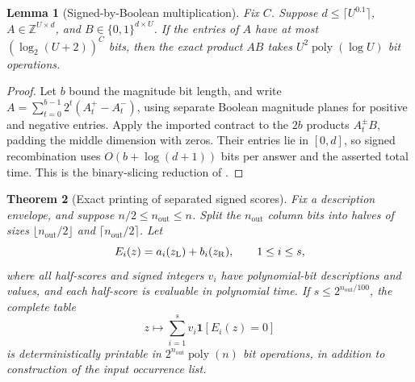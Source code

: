 \documentclass[11pt,letterpaper]{article}
\newtheorem{theorem}{Theorem}[section]
\newtheorem{lemma}[theorem]{Lemma}
\theoremstyle{definition}
\theoremstyle{remark}
\newcommand{\poly}{\operatorname{poly}}
\newcommand{\ind}{\mathbf 1}
\begin{document}
\begin{lemma}[Signed-by-Boolean multiplication]
\label{alg:rectangular}
Fix $C$.  Suppose $d\le\lceil U^{0.1}\rceil$,
$A\in\mathbb Z^{U\times d}$, and $B\in\{0,1\}^{d\times U}$.
If the entries of $A$ have at most $(\log_2(U+2))^C$ bits, then the exact
product $AB$ takes $U^2\poly(\log U)$ bit operations.
\end{lemma}

\begin{proof}
Let $b$ bound the magnitude bit length, and write
$A=\sum_{t=0}^{b-1}2^t(A_t^+-A_t^-)$, using separate Boolean magnitude
planes for positive and negative entries.  Apply the imported contract to
the $2b$ products $A_t^\pm B$, padding the middle dimension with zeros.
Their entries lie in $[0,d]$, so signed recombination uses
$O(b+\log(d+1))$ bits per answer and the asserted total time.  This is
the binary-slicing reduction of \cite[Lemma~B.2]{NagCubic}.
\end{proof}

\begin{theorem}[Exact printing of separated signed scores]
\label{alg:separable-printer}
Fix a description envelope, and suppose $n/2\le n_{\mathrm{out}}\le n$.  Split the $n_{\mathrm{out}}$
column bits into halves of sizes $\lfloor n_{\mathrm{out}}/2\rfloor$ and
$\lceil n_{\mathrm{out}}/2\rceil$.  Let
\[
 E_i(z)=a_i(z_{\rm L})+b_i(z_{\rm R}),\qquad 1\le i\le s,
\]
where all half-scores and signed integers $v_i$ have polynomial-bit
descriptions and values, and each half-score is evaluable in polynomial
time.  If $s\le 2^{n_{\mathrm{out}}/100}$, the complete table
\[
 z\longmapsto\sum_{i=1}^s v_i\ind[E_i(z)=0]
\]
is deterministically printable in $2^{n_{\mathrm{out}}}\poly(n)$ bit operations, in
addition to construction of the input occurrence list.
\end{theorem}
\end{document}
